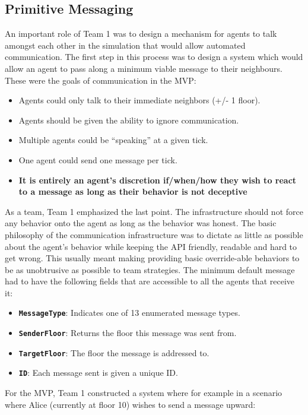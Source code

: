 \subsection{Primitive Messaging}
An important role of Team 1 was to design a mechanism for agents to talk amongst each other in the simulation that would allow automated communication. The first step in this process was to design a system which would allow an agent to pass along a minimum viable message to their neighbours. These were the goals of communication in the MVP:
\begin{itemize}
    \item Agents could only talk to their immediate neighbors (+/- 1 floor).
    \item Agents should be given the ability to ignore communication.
    \item Multiple agents could be “speaking” at a given tick.
    \item One agent could send one message per tick.
    \item \textbf{It is entirely an agent's discretion if/when/how they wish to react to a message as long as their behavior is not deceptive}
\end{itemize}
As a team, Team 1 emphasized the last point. The infrastructure should not force any behavior onto the agent as long as the behavior was honest. The basic philosophy of the communication infrastructure was to dictate as little as possible about the agent's behavior while keeping the API friendly, readable and hard to get wrong. This usually meant making providing basic override-able behaviors to be as unobtrusive as possible to team strategies. \newline
The minimum default message had to have the following fields that are accessible to all the agents that receive it:
\begin{itemize}
    \item \textbf{\texttt{MessageType}}: Indicates one of 13 enumerated message types.
    \item \textbf{\texttt{SenderFloor}}: Returns the floor this message was sent from.
    \item \textbf{\texttt{TargetFloor}}: The floor the message is addressed to.
    \item \textbf{\texttt{ID}}: Each message sent is given a unique ID.
\end{itemize}
\vspace{\baselineskip}
For the MVP, Team 1 constructed a system where for example in a scenario where Alice (currently at floor 10) wishes to send a message upward:
